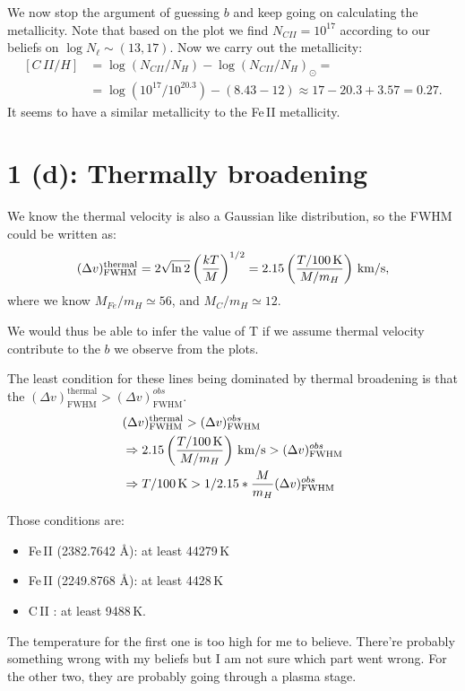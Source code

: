 \documentclass[12pt,letterpaper]{article}
\newcommand{\mt}{\mathrm}
\newcommand{\columndensity}{N_\ell}
\newcommand{\kms}{\textrm{\,km/s}}
\newcommand{\dvfwhm}{(\Delta v)_{\textrm{FWHM}}}
\begin{document}
We now stop the argument of guessing $b$ and keep going on calculating the metallicity.
Note that based on the plot we find $N_{CII} = 10^{17}$ according to our beliefs on $\log{\columndensity} \sim (13, 17)$.
Now we carry out the metallicity:
\begin{equation*}
    \begin{split}
        [C\,II/H] &= 
        \log{(N_{CII} / N_H)} - \log{(N_{CII} / N_H)}_\odot =\\
        &= \log{(10^{17} / 10^{20.3})} - ( 8.43 - 12 ) \approx 
        17 - 20.3 + 3.57 = 0.27.                
    \end{split}
\end{equation*}
It seems to have a similar metallicity to the Fe\,II metallicity.

\section*{1 (d): Thermally broadening}
We know the thermal velocity is also a Gaussian like distribution, so the FWHM could be written as:
\begin{equation}
    \dvfwhm^{\textrm{thermal}} = 2 \sqrt{\ln 2} \left( \frac{k T}{M} \right)^{1/2} 
    = 2.15 \left( \frac{T / 100\, \mt K}{M / m_H} \right)
    \kms,
\end{equation}
where we know $M_{Fe} / m_H \simeq 56$, and $M_{C} / m_H \simeq 12$.

We would thus be able to infer the value of T if we assume thermal velocity contribute to the $b$ we observe from the plots.

The least condition for these lines being dominated by thermal broadening is that the $\dvfwhm^{\textrm{thermal}} > \dvfwhm^{obs}$.
\begin{equation*}
    \begin{split}
        &\dvfwhm^{\textrm{thermal}} > \dvfwhm^{obs}\\
        &\Rightarrow
        2.15 \left( \frac{T / 100\, \mt K}{M / m_H} \right)
    \kms >  \dvfwhm^{obs}\\
        &\Rightarrow
        T / 100\, {\mt K} > 1/2.15 * \frac{M}{m_H} \dvfwhm^{obs}
    \end{split}
\end{equation*}

Those conditions are:
\begin{itemize}
    \item Fe\,II (2382.7642 \AA): at least 44279\,K
    \item Fe\,II (2249.8768 \AA): at least 4428\,K
    \item C\,II : at least 9488\,K.
\end{itemize}
The temperature for the first one is too high for me to believe.
There're probably something wrong with my beliefs but I am not sure which part went wrong.
For the other two, they are probably going through a plasma stage.
\end{document}
